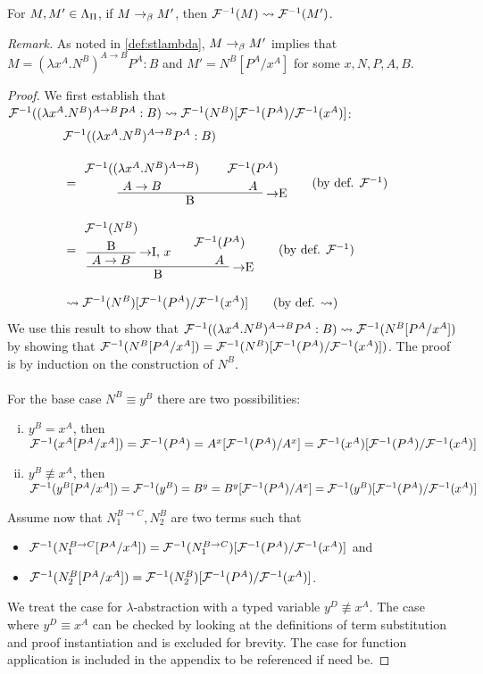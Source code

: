\begin{proposition}
For $M, M' \in \Lambda_\Pi$, if $M \rightarrow_\beta M'$, then $\mathcal{F}^{-1}(M) \leadsto
\mathcal{F}^{-1}(M')$.
\end{proposition}
\noindent\emph{Remark.}
As noted in \ref{def:stlambda}, $M \rightarrow_\beta M'$ implies that $M = (\lambda
x^A.N^B)^{A \to B}P^A:B$ and $M' = N^B[P^A/x^A]$ for some $x, N, P, A, B$.
\begin{proof}
We first establish that $\mathcal{F}^{-1}((\lambda x^A.N^B)^{A \to B}P^A:B) \leadsto
\mathcal{F}^{-1}(N^B)[\mathcal{F}^{-1}(P^A)/\mathcal{F}^{-1}(x^A)]$:
\begin{align*}
\lefteqn{\chmapanta((\lambda x^A.N^B)^{A \to B}P^A:B)} \\[10pt]
  &= \implelim{%
       \AxiomC{$\chmapanta((\lambda x^A.N^B)^{A \to B})$}
       \noLine
       \UnaryInfC{$A \to B$}
     }{%
       \AxiomC{$\chmapanta(P^A)$}
       \noLine
       \UnaryInfC{$A$}
     }{B}
     \DisplayProof
     \tag{by def. $\chmapanta$} \\[10pt]
  &= \implelim{%
       \implintro{
         \AxiomC{$\chmapanta(N^B)$}
         \noLine
         \UnaryInfC{B}
       }{x}{$A \to B$}
     }{%
       \AxiomC{$\chmapanta(P^A)$}
       \noLine
       \UnaryInfC{$A$}
     }{B}
     \DisplayProof
     \tag{by def. $\chmapanta$} \\[10pt]
  &\leadsto \chmapanta(N^B)[\chmapanta(P^A)/\chmapanta(x^A)]
     \tag{by def. $\leadsto$}
\end{align*}
We use this result to show that $\mathcal{F}^{-1}((\lambda x^A.N^B)^{A \to B}P^A:B)
\leadsto \mathcal{F}^{-1}(N^B[P^A/x^A])$ by showing that
$\mathcal{F}^{-1}(N^B[P^A/x^A]) = \mathcal{F}^{-1}(N^B)[\mathcal{F}^{-1}(P^A)/\mathcal{F}^{-1}(x^A)])$.
The proof is by induction on the construction of $N^B$. \\
\\
For the base case $N^B \equiv y^B$ there are two possibilities:
\begin{enumerate}[(i)]
  \item $y^B = x^A$, then \\
        $\mathcal{F}^{-1}(x^A[P^A/x^A]) = \mathcal{F}^{-1}(P^A) =
        A^x[\mathcal{F}^{-1}(P^A)/A^x] =
        \mathcal{F}^{-1}(x^A)[\mathcal{F}^{-1}(P^A)/\mathcal{F}^{-1}(x^A)]$
  \item $y^B \not\equiv x^A$, then \\
        $\mathcal{F}^{-1}(y^B[P^A/x^A]) = \mathcal{F}^{-1}(y^B) = B^y =
        B^y[\mathcal{F}^{-1}(P^A)/A^x] =
        \mathcal{F}^{-1}(y^B)[\mathcal{F}^{-1}(P^A)/\mathcal{F}^{-1}(x^A)]$
\end{enumerate}
Assume now that $N_1^{B \to C}, N_2^B$ are two terms such that
\begin{itemize}
\item $\mathcal{F}^{-1}(N_1^{B \to C}[P^A/x^A])
      = \mathcal{F}^{-1}(N_1^{B \to C})[\mathcal{F}^{-1}(P^A)/\mathcal{F}^{-1}(x^A)]$ and
\item $\mathcal{F}^{-1}(N_2^B[P^A/x^A]) = \mathcal{F}^{-1}(N_2^B)[\mathcal{F}^{-1}(P^A)/\mathcal{F}^{-1}(x^A)]$.
\end{itemize}
We treat the case for $\lambda$-abstraction with a typed variable $y^D \not\equiv
x^A$. The case where $y^D \equiv x^A$ can be checked by looking at the
definitions of term substitution and proof instantiation and is excluded for
brevity. The case for function application is included in the appendix to be
referenced if need be.


\end{proof}
